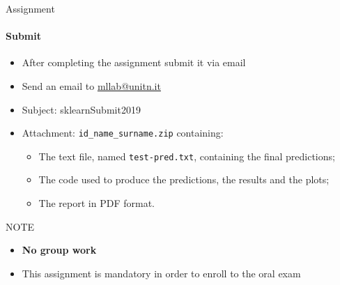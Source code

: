 \documentclass{beamer}
\begin{document}
\begin{frame}{Assignment}
\framesubtitle{Submit}

\begin{itemize}
    \item After completing the assignment submit it via email
    \item Send an email to \href{mailto:mllab@unitn.it}{mllab@unitn.it} 
    \item Subject: sklearnSubmit2019
    \item Attachment: \texttt{id\_name\_surname.zip} containing:
    \begin{itemize}
	    \item The text file, named \texttt{test-pred.txt},  containing the final predictions;
        \item The code used to produce the predictions, the results and the plots;
        \item The report in PDF format.
    \end{itemize}
\end{itemize}
\begin{alertblock}{NOTE}
    \begin{itemize}
	\item \textbf{No group work}
        \item This assignment is mandatory in order to enroll to the oral exam
    \end{itemize}
\end{alertblock}

\end{frame}
\end{document}
